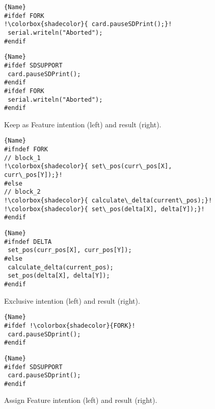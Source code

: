 \begin{figure}[ht]
    \centering
    \begin{minipage}{.40\textwidth}
\begin{lstlisting}[caption=Wrapped code by PC,escapechar=!]{Name}
#ifdef FORK
!\colorbox{shadecolor}{ card.pauseSDPrint();}!
 serial.writeln("Aborted");
#endif
\end{lstlisting}
\end{minipage}\qquad
\begin{minipage}{.40\textwidth}
\begin{lstlisting}[caption=Unwrapped code,escapechar=!]{Name}
#ifdef SDSUPPORT
 card.pauseSDPrint();
#endif
#ifdef FORK
 serial.writeln("Aborted");
#endif
\end{lstlisting}
    \end{minipage}
    \caption{Keep as Feature intention (left) and result (right).}
    \label{fig:keepasfeature}
\end{figure}

\begin{figure}[ht]
    \centering
    \begin{minipage}{.50\textwidth}
\begin{lstlisting}[caption=Wrapped code by PC,escapechar=!]{Name}
#ifndef FORK
// block_1
!\colorbox{shadecolor}{ set\_pos(curr\_pos[X], curr\_pos[Y]);}!
#else
// block_2
!\colorbox{shadecolor}{ calculate\_delta(current\_pos);}!
!\colorbox{shadecolor}{ set\_pos(delta[X], delta[Y]);}!
#endif
\end{lstlisting}
\end{minipage}\qquad
\begin{minipage}{.50\textwidth}
\begin{lstlisting}[caption=Unwrapped code,escapechar=!]{Name}
#ifndef DELTA
 set_pos(curr_pos[X], curr_pos[Y]);
#else
 calculate_delta(current_pos);
 set_pos(delta[X], delta[Y]);
#endif
\end{lstlisting}
    \end{minipage}
    \caption{Exclusive intention (left) and result (right).}
    \label{fig:exclusive}
\end{figure}

\begin{figure}[ht]
    \centering
    \begin{minipage}{.35\textwidth}
\begin{lstlisting}[caption=Wrapped code by PC,escapechar=!]{Name}
#ifdef !\colorbox{shadecolor}{FORK}!
 card.pauseSDprint();
#endif
\end{lstlisting}
\end{minipage}\qquad
\begin{minipage}{.35\textwidth}
\begin{lstlisting}[caption=Unwrapped code,escapechar=!]{Name}
#ifdef SDSUPPORT
 card.pauseSDprint();
#endif
\end{lstlisting}
    \end{minipage}
    \caption{Assign Feature intention (left) and result (right).}
    \label{fig:assignfeature}
\end{figure}